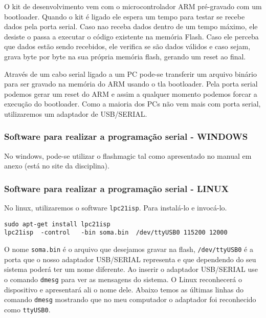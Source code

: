 \documentclass[a4paper,10pt]{article}
\begin{document}
O kit de desenvolvimento vem com o microcontrolador ARM pré-gravado com um bootloader. Quando o kit é ligado ele espera um tempo para testar se recebe dados pela porta serial. Caso nao receba dados dentro de um tempo máximo, ele desiste o passa a executar o código existente na memória Flash. Caso ele perceba que dados estão sendo recebidos, ele verifica se são dados válidos e caso sejam, grava byte por byte na sua própria memória flash, gerando um reset ao final.


Através de um cabo serial ligado a um PC pode-se transferir um arquivo binário para ser gravado na memória do ARM usando o tla bootloader. Pela porta serial podemos gerar um reset do ARM e assim a qualquer momento podemos forcar a execução do bootloader. Como a maioria dos PCs não vem mais com porta serial, utilizaremos um adaptador de USB/SERIAL. 

\subsubsection{Software para realizar a programação serial - WINDOWS}
No windows, pode-se utilizar o flashmagic tal como apresentado no manual em anexo (está no site da disciplina).

\subsubsection{Software para realizar a programação serial - LINUX}
No linux, utilizaremos o software \verb|lpc21isp|. Para instalá-lo e invocá-lo.

\begin{lstlisting}
sudo apt-get install lpc21isp
lpc21isp  -control   -bin soma.bin  /dev/ttyUSB0 115200 12000

\end{lstlisting}

O nome \verb|soma.bin| é o arquivo que desejamos gravar na flash, \verb|/dev/ttyUSB0| é a porta que o nosso adaptador USB/SERIAL representa e que dependendo do seu sistema poderá ter um nome diferente. Ao inserir o adaptador USB/SERIAL use o comando \verb|dmesg| para ver as mensagens do sistema. O Linux reconhecerá o dispositivo e apresentará ali o nome dele. Abaixo temos as últimas linhas do comando \verb|dmesg| mostrando que no meu computador o adaptador foi reconhecido como \verb|ttyUSB0|.
\end{document}
